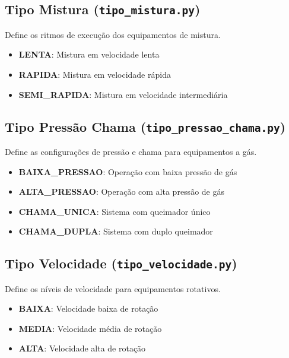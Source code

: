 \documentclass[11pt,a4paper]{article}
\begin{document}
\subsection{Tipo Mistura (\texttt{tipo\_mistura.py})}

Define os ritmos de execução dos equipamentos de mistura.

\begin{itemize}[leftmargin=2cm]
    \item \textbf{LENTA}: Mistura em velocidade lenta
    \item \textbf{RAPIDA}: Mistura em velocidade rápida
    \item \textbf{SEMI\_RAPIDA}: Mistura em velocidade intermediária
\end{itemize}

\subsection{Tipo Pressão Chama (\texttt{tipo\_pressao\_chama.py})}

Define as configurações de pressão e chama para equipamentos a gás.

\begin{itemize}[leftmargin=2cm]
    \item \textbf{BAIXA\_PRESSAO}: Operação com baixa pressão de gás
    \item \textbf{ALTA\_PRESSAO}: Operação com alta pressão de gás
    \item \textbf{CHAMA\_UNICA}: Sistema com queimador único
    \item \textbf{CHAMA\_DUPLA}: Sistema com duplo queimador
\end{itemize}

\subsection{Tipo Velocidade (\texttt{tipo\_velocidade.py})}

Define os níveis de velocidade para equipamentos rotativos.

\begin{itemize}[leftmargin=2cm]
    \item \textbf{BAIXA}: Velocidade baixa de rotação
    \item \textbf{MEDIA}: Velocidade média de rotação
    \item \textbf{ALTA}: Velocidade alta de rotação
\end{itemize}

\newpage
\end{document}
